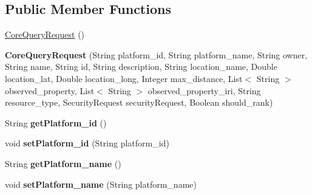 \subsection*{Public Member Functions}
\begin{DoxyCompactItemize}
\item 
\hyperlink{classeu_1_1h2020_1_1symbiote_1_1core_1_1internal_1_1CoreQueryRequest_a6377f7640add9a0e3c0ea7bfd2d81f5b}{Core\+Query\+Request} ()
\item 
\mbox{\label{classeu_1_1h2020_1_1symbiote_1_1core_1_1internal_1_1CoreQueryRequest_a36660bc6478bf2737fa82549990e8e9d}} 
{\bfseries Core\+Query\+Request} (String platform\+\_\+id, String platform\+\_\+name, String owner, String name, String id, String description, String location\+\_\+name, Double location\+\_\+lat, Double location\+\_\+long, Integer max\+\_\+distance, List$<$ String $>$ observed\+\_\+property, List$<$ String $>$ observed\+\_\+property\+\_\+iri, String resource\+\_\+type, Security\+Request security\+Request, Boolean should\+\_\+rank)
\item 
\mbox{\label{classeu_1_1h2020_1_1symbiote_1_1core_1_1internal_1_1CoreQueryRequest_acdaeb579965fa28eefe212ee57568f96}} 
String {\bfseries get\+Platform\+\_\+id} ()
\item 
\mbox{\label{classeu_1_1h2020_1_1symbiote_1_1core_1_1internal_1_1CoreQueryRequest_aa2d6f42b027616b55c0030f257ec713a}} 
void {\bfseries set\+Platform\+\_\+id} (String platform\+\_\+id)
\item 
\mbox{\label{classeu_1_1h2020_1_1symbiote_1_1core_1_1internal_1_1CoreQueryRequest_a718618105266cd14df8cb0ffbc6db80a}} 
String {\bfseries get\+Platform\+\_\+name} ()
\item 
\mbox{\label{classeu_1_1h2020_1_1symbiote_1_1core_1_1internal_1_1CoreQueryRequest_ae8132ea9caef7503993b1435820686ce}} 
void {\bfseries set\+Platform\+\_\+name} (String platform\+\_\+name)
\item 
\mbox{\label{classeu_1_1h2020_1_1symbiote_1_1core_1_1internal_1_1CoreQueryRequest_a2c3e2ffb5c65343773b13c95e478bdc1}} 

\end{DoxyCompactItemize}

